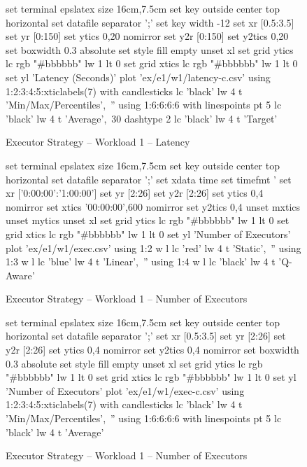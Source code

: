 \begin{figure}[!htbp]
	\centering
	\begin{minipage}[h]{\linewidth}
		\centering
		\begin{gnuplot}[terminal=epslatex, terminaloptions=color colortext]
			set terminal epslatex size 16cm,7.5cm
			set key outside center top horizontal
			set datafile separator ';'
            set key width -12
			set xr [0.5:3.5]
			set yr [0:150]
			set ytics 0,20 nomirror
			set y2r [0:150]
			set y2tics 0,20
			set boxwidth 0.3 absolute
			set style fill empty
			unset xl
            set grid ytics lc rgb "#bbbbbb" lw 1 lt 0
            set grid xtics lc rgb "#bbbbbb" lw 1 lt 0
			set yl 'Latency (Seconds)'
			plot 'ex/e1/w1/latency-c.csv' using 1:2:3:4:5:xticlabels(7) with candlesticks lc 'black' lw 4 t 'Min/Max/Percentiles',\
			'' using 1:6:6:6:6 with linespoints pt 5 lc 'black' lw 4 t 'Average',\
            30 dashtype 2 lc 'black' lw 4 t 'Target'
		\end{gnuplot}
		\caption{Executor Strategy -- Workload 1 -- Latency}
		\label{eval:f:e1:w1:lat-c}
	\end{minipage}\hfil
	\begin{minipage}[h]{\linewidth}
		\centering
		\begin{gnuplot}[terminal=epslatex, terminaloptions=color colortext]
			set terminal epslatex size 16cm,7.5cm
			set key outside center top horizontal
			set datafile separator ';'
			set xdata time
			set timefmt '%
			set xr ['0:00:00':'1:00:00']
			set yr [2:26]
			set y2r [2:26]
			set ytics 0,4 nomirror
			set xtics '00:00:00',600 nomirror
			set y2tics 0,4
			unset mxtics
			unset mytics
			unset xl
            set grid ytics lc rgb "#bbbbbb" lw 1 lt 0
            set grid xtics lc rgb "#bbbbbb" lw 1 lt 0
			set yl 'Number of Executors'
			plot 'ex/e1/w1/exec.csv' using 1:2 w l lc 'red' lw 4 t 'Static',\
			'' using 1:3 w l lc 'blue' lw 4 t 'Linear',\
			'' using 1:4 w l lc 'black' lw 4 t 'Q-Aware'
		\end{gnuplot}
		\caption{Executor Strategy -- Workload 1 -- Number of Executors}
		\label{eval:f:e1:w1:exec}
	\end{minipage}\hfil
	\begin{minipage}[h]{\linewidth}
		\centering
		\begin{gnuplot}[terminal=epslatex, terminaloptions=color colortext]
			set terminal epslatex size 16cm,7.5cm
			set key outside center top horizontal
			set datafile separator ';'
			set xr [0.5:3.5]
			set yr [2:26]
			set y2r [2:26]
			set ytics 0,4 nomirror
			set y2tics 0,4 nomirror
			set boxwidth 0.3 absolute
			set style fill empty
			unset xl
            set grid ytics lc rgb "#bbbbbb" lw 1 lt 0
            set grid xtics lc rgb "#bbbbbb" lw 1 lt 0
			set yl 'Number of Executors'
			plot 'ex/e1/w1/exec-c.csv' using 1:2:3:4:5:xticlabels(7) with candlesticks lc 'black' lw 4 t 'Min/Max/Percentiles',\
			'' using 1:6:6:6:6 with linespoints pt 5 lc 'black' lw 4 t 'Average' 
		\end{gnuplot}
		\caption{Executor Strategy -- Workload 1 -- Number of Executors}
		\label{eval:f:e1:w1:exec-c}
	\end{minipage}
\end{figure}

